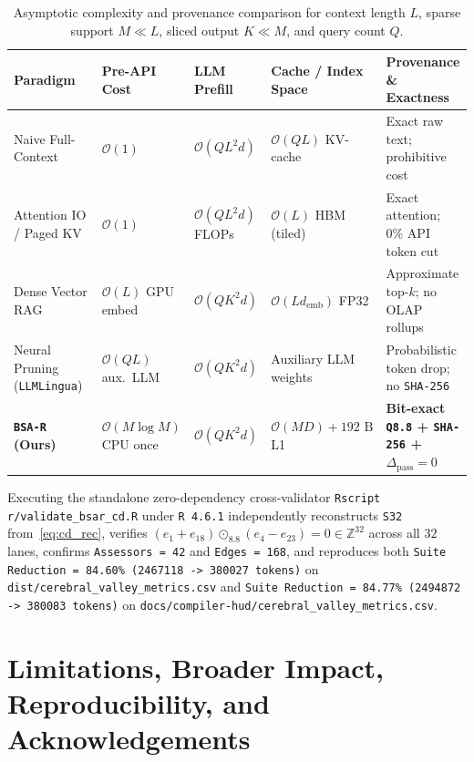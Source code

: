 \documentclass[11pt]{article}
\theoremstyle{plain}
\theoremstyle{definition}
\begin{document}
\begin{table}[htbp]
\centering
\caption{Asymptotic complexity and provenance comparison for context length $L$, sparse support $M \ll L$, sliced output $K \ll M$, and query count $Q$.}\label{tab:complexity}
\vspace{4pt}
\footnotesize
\begin{tabular}{@{}lllll@{}}
\toprule
Paradigm & Pre-API Cost & LLM Prefill & Cache / Index Space & Provenance \& Exactness \\
\midrule
Naive Full-Context~\cite{vaswani2017attention} & $\mathcal{O}(1)$ & $\mathcal{O}(Q L^2 d)$ & $\mathcal{O}(Q L)$ KV-cache & Exact raw text; prohibitive cost \\
Attention IO / Paged KV~\cite{dao2022flashattention,kwon2023vllm} & $\mathcal{O}(1)$ & $\mathcal{O}(Q L^2 d)$ FLOPs & $\mathcal{O}(L)$ HBM (tiled) & Exact attention; $0\%$ API token cut \\
Dense Vector RAG~\cite{lewis2020rag} & $\mathcal{O}(L)$ GPU embed & $\mathcal{O}(Q K^2 d)$ & $\mathcal{O}(L d_{\mathrm{emb}})$ FP32 & Approximate top-$k$; no OLAP rollups \\
Neural Pruning (\texttt{LLMLingua})~\cite{jiang2023llmlingua} & $\mathcal{O}(Q L)$ aux.\ LLM & $\mathcal{O}(Q K^2 d)$ & Auxiliary LLM weights & Probabilistic token drop; no \texttt{SHA-256} \\
\textbf{\texttt{BSA-R} (Ours)} & $\mathcal{O}(M \log M)$ CPU once & $\mathcal{O}(Q K^2 d)$ & $\mathcal{O}(M D) + 192\text{ B}$ L1 & \textbf{Bit-exact \texttt{Q8.8} + \texttt{SHA-256} + $\Delta_{\mathrm{pass}}=0$} \\
\bottomrule
\end{tabular}
\end{table}

Executing the standalone zero-dependency cross-validator \texttt{Rscript r/validate\_bsar\_cd.R} under \texttt{R 4.6.1} independently reconstructs \texttt{S32} from~\eqref{eq:cd_rec}, verifies $(e_1 + e_{18}) \odot_{8.8} (e_4 - e_{23}) = 0 \in \mathbb{Z}^{32}$ across all $32$ lanes, confirms \texttt{Assessors = 42} and \texttt{Edges = 168}, and reproduces both \texttt{Suite Reduction = 84.60\% (2467118 -> 380027 tokens)} on \texttt{dist/cerebral\_valley\_metrics.csv} and \texttt{Suite Reduction = 84.77\% (2494872 -> 380083 tokens)} on \texttt{docs/compiler-hud/cerebral\_valley\_metrics.csv}.

\section{Limitations, Broader Impact, Reproducibility, and Acknowledgements}\label{sec:conclusion}
\end{document}
